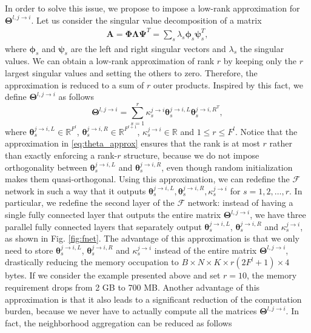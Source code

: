 \documentclass[journal]{IEEEtran}
\newcommand{\Lambdab}{\bm{\Lambda}}
\newcommand{\fun}{\mathcal{F}}
\begin{document}
In order to solve this issue, we propose to impose a low-rank approximation for $\bm{\Theta}^{l,j\to i}$. Let us consider the singular value decomposition of a matrix  
\begin{align*}
\mathbf{A} = \bm{\Phi}\Lambdab \bm{\Psi}^T = \sum_{s}\lambda_s \bm{\phi}_s\bm{\psi}_s^T,
\end{align*}
where $\bm{\phi}_s$ and $\bm{\psi}_s$ are the left and right singular vectors and $\lambda_s$ the singular values. We can obtain a low-rank approximation of rank $r$ by keeping only the $r$ largest singular values and setting the others to zero. Therefore, the approximation is reduced to a sum of $r$ outer products. Inspired by this fact, we define $\bm{\Theta}^{l,j\to i}$ as follows
\begin{equation}
\bm{\Theta}^{l,j\to i}=\sum_{s=1}^r\kappa_s^{j\to i}\bm{\theta}_s^{j\to i,L} \bm{\theta}_s^{j\to i,R^T},    
\label{eq:theta_approx}
\end{equation}
where $\bm{\theta}_s^{j\to i,L}\in\mathbb{R}^{F^{l}}$, $\bm{\theta}_s^{j\to i,R}\in\mathbb{R}^{F^{l+1}}$, $\kappa_s^{j\to i}\in\mathbb{R}$ and $1\le r\le F^l$. Notice that the approximation in \eqref{eq:theta_approx} ensures that the rank is at most $r$ rather than exactly enforcing a rank-$r$ structure, because we do not impose orthogonality between $\bm{\theta}_s^{j\to i,L}$ and $\bm{\theta}_s^{j\to i,R}$, even though random initialization makes them quasi-orthogonal. Using this approximation, we can redefine the $\fun$ network in such a way that it outputs $\bm{\theta}_s^{j\to i,L},\bm{\theta}_s^{j\to i,R},\kappa_s^{j\to i}$ for $s=1,2,\dots,r$. In particular, we redefine the second layer of the $\fun$ network: instead of having a single fully connected layer that outputs the entire matrix $\bm{\Theta}^{l,j\to i}$, we have three parallel fully connected layers that separately output $\bm{\theta}_s^{j\to i,L}$, $\bm{\theta}_s^{j\to i,R}$ and $\kappa_s^{j\to i}$, as shown in Fig. \ref{fig:fnet}. The advantage of this approximation is that we only need to store $\bm{\theta}_s^{j\to i,L}$,  $\bm{\theta}_s^{j\to i,R}$ and $\kappa_s^{j\to i}$ instead of the entire matrix $\bm{\Theta}^{l,j\to i}$, drastically reducing the memory occupation to $B\times N\times K\times r(2F^l+1) \times 4$ bytes. If we consider the example presented above and set $r=10$, the memory requirement drops from 2 GB to 700 MB. Another advantage of this approximation is that it also leads to a significant reduction of the computation burden, because we never have to actually compute all the matrices $\bm{\Theta}^{l,j\to i}$. In fact, the neighborhood aggregation can be reduced as follows
\end{document}

